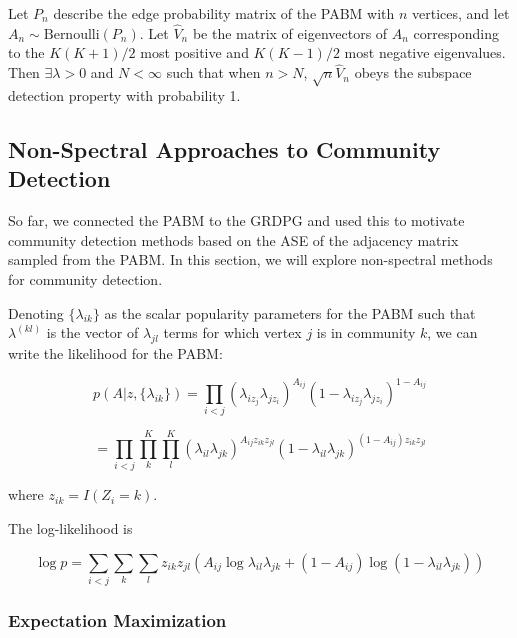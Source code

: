 \documentclass[
  11pt,
]{article}
\begin{document}
\begin{theorem}
\label{theorem5}
Let $P_n$ describe the edge probability matrix of the PABM with 
$n$ vertices, and let $A_n \sim \text{Bernoulli}(P_n)$.  Let $\hat{V}_n$ be the 
matrix of eigenvectors of $A_n$ corresponding to the $K (K + 1) / 2$ most
positive and $K (K - 1) / 2$ most negative eigenvalues. Then 
$\exists \lambda > 0$ and $N < \infty$ such that when $n > N$, 
$\sqrt{n} \hat{V}_n$ obeys the subspace detection property with probability 1.
\end{theorem}

\hypertarget{non-spectral-approaches-to-community-detection}{%
\subsection{Non-Spectral Approaches to Community
Detection}\label{non-spectral-approaches-to-community-detection}}

So far, we connected the PABM to the GRDPG and used this to motivate
community detection methods based on the ASE of the adjacency matrix
sampled from the PABM. In this section, we will explore non-spectral
methods for community detection.

Denoting \(\{\lambda_{ik}\}\) as the scalar popularity parameters for
the PABM such that \(\lambda^{(kl)}\) is the vector of \(\lambda_{jl}\)
terms for which vertex \(j\) is in community \(k\), we can write the
likelihood for the PABM:

\[p(A | z, \{\lambda_{ik}\}) = 
\prod_{i < j} (\lambda_{i z_j} \lambda_{j z_i})^{A_{ij}} 
(1 - \lambda_{i z_j} \lambda_{j z_i})^{1 - A_{ij}}\]

\begin{equation}
= \prod_{i < j} \prod_k^K \prod_l^K 
(\lambda_{il} \lambda_{jk})^{A_{ij} z_{ik} z_{jl}} 
(1 - \lambda_{il} \lambda_{jk})^{(1 - A_{ij}) z_{ik} z_{jl}}
\end{equation}

where \(z_{ik} = I(Z_i = k)\).

The log-likelihood is

\begin{equation}
\log p = \sum_{i < j} \sum_k \sum_l z_{ik} z_{jl} 
(A_{ij} \log \lambda_{il} \lambda_{jk} + 
(1 - A_{ij}) \log (1 - \lambda_{il} \lambda_{jk}))
\end{equation}

\hypertarget{expectation-maximization}{%
\subsubsection{Expectation
Maximization}\label{expectation-maximization}}
\end{document}
